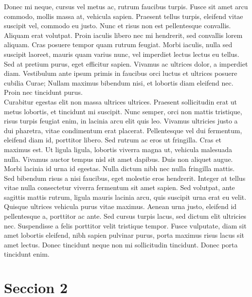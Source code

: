 Donec mi neque, cursus vel metus ac, rutrum faucibus turpis. Fusce sit amet arcu commodo, mollis massa at, vehicula sapien. Praesent tellus turpis, eleifend vitae suscipit vel, commodo eu justo. Nunc et risus non est pellentesque convallis. Aliquam erat volutpat. Proin iaculis libero nec mi hendrerit, sed convallis lorem aliquam. Cras posuere tempor quam rutrum feugiat. Morbi iaculis, nulla sed suscipit laoreet, mauris quam varius nunc, vel imperdiet lectus lectus eu tellus. Sed at pretium purus, eget efficitur sapien. Vivamus ac ultrices dolor, a imperdiet diam. Vestibulum ante ipsum primis in faucibus orci luctus et ultrices posuere cubilia Curae; Nullam maximus bibendum nisi, et lobortis diam eleifend nec. Proin nec tincidunt purus. 
\\

Curabitur egestas elit non massa ultrices ultrices. Praesent sollicitudin erat ut metus lobortis, et tincidunt mi suscipit. Nunc semper, orci non mattis tristique, risus turpis feugiat enim, in lacinia arcu elit quis leo. Vivamus ultricies justo a dui pharetra, vitae condimentum erat placerat. Pellentesque vel dui fermentum, eleifend diam id, porttitor libero. Sed rutrum ac eros ut fringilla. Cras et maximus est. Ut ligula ligula, lobortis viverra magna ut, vehicula malesuada nulla. Vivamus auctor tempus nisl sit amet dapibus. Duis non aliquet augue. Morbi lacinia id urna id egestas. Nulla dictum nibh nec nulla fringilla mattis.
\\

Sed bibendum risus a nisi faucibus, eget molestie eros hendrerit. Integer at tellus vitae nulla consectetur viverra fermentum sit amet sapien. Sed volutpat, ante sagittis mattis rutrum, ligula mauris lacinia arcu, quis suscipit urna erat eu velit. Quisque ultrices vehicula purus vitae maximus. Aenean urna justo, eleifend id pellentesque a, porttitor ac ante. Sed cursus turpis lacus, sed dictum elit ultricies nec. Suspendisse a felis porttitor velit tristique tempor. Fusce vulputate, diam sit amet lobortis eleifend, nibh sapien pulvinar purus, porta maximus risus lacus sit amet lectus. Donec tincidunt neque non mi sollicitudin tincidunt. Donec porta tincidunt enim.
\\

\section{Seccion 2}

